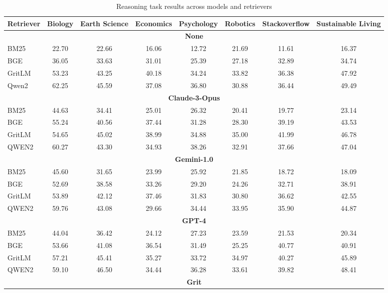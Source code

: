\documentclass[11pt]{article}
\begin{document}
\begin{table}[h]
\caption{Reasoning task results across models and retrievers}
\centering
\scriptsize
\begin{tabular}{l|ccccccc}
\toprule
\textbf{Retriever} & \textbf{Biology} & \textbf{Earth Science} & \textbf{Economics} & \textbf{Psychology} & \textbf{Robotics} & \textbf{Stackoverflow} & \textbf{Sustainable Living} \\
\midrule
\multicolumn{8}{c}{\textbf{None}} \\
\midrule
BM25   & 22.70 & 22.66 & 16.06 & 12.72 & 21.69 & 11.61 & 16.37 \\
BGE    & 36.05 & 33.63 & 31.01 & 25.39 & 27.18 & 32.89 & 34.74 \\
GritLM & 53.23 & 43.25 & 40.18 & 34.24 & 33.82 & 36.38 & 47.92 \\
Qwen2  & 62.25 & 45.59 & 37.08 & 36.80 & 30.88 & 36.44 & 49.49 \\
\midrule
\multicolumn{8}{c}{\textbf{Claude-3-Opus}} \\
\midrule
BM25   & 44.63 & 34.41 & 25.01 & 26.32 & 20.41 & 19.77 & 23.14 \\
BGE    & 55.24 & 40.56 & 37.44 & 31.28 & 28.30 & 39.19 & 43.53 \\
GritLM & 54.65 & 45.02 & 38.99 & 34.88 & 35.00 & 41.99 & 46.78 \\
QWEN2  & 60.27 & 43.30 & 34.93 & 38.26 & 32.91 & 37.66 & 47.04 \\
\midrule
\multicolumn{8}{c}{\textbf{Gemini-1.0}} \\
\midrule
BM25   & 45.60 & 31.65 & 23.99 & 25.92 & 21.85 & 18.72 & 18.09 \\
BGE    & 52.69 & 38.58 & 33.26 & 29.20 & 24.26 & 32.71 & 38.91 \\
GritLM & 53.89 & 42.12 & 37.46 & 31.83 & 30.80 & 36.62 & 42.55 \\
QWEN2  & 59.76 & 43.08 & 29.66 & 34.44 & 33.95 & 35.90 & 44.87 \\
\midrule
\multicolumn{8}{c}{\textbf{GPT-4}} \\
\midrule
BM25   & 44.04 & 36.42 & 24.12 & 27.23 & 23.59 & 21.53 & 20.34 \\
BGE    & 53.66 & 41.08 & 36.54 & 31.49 & 25.25 & 40.77 & 40.91 \\
GritLM & 57.21 & 45.41 & 35.27 & 33.72 & 34.97 & 40.27 & 45.89 \\
QWEN2  & 59.10 & 46.50 & 34.44 & 36.28 & 33.61 & 39.82 & 48.41 \\
\midrule
\multicolumn{8}{c}{\textbf{Grit}} \\

\end{tabular}
\end{table}
\end{document}
